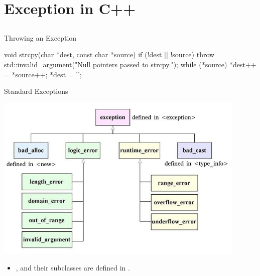 \documentclass{beamer}
\begin{document}
\section{Exception in C++}

\subsection{}

\begin{frame}[fragile]{Throwing an Exception}
    \begin{cpp}
void strcpy(char *dest, const char *source) {
  if (!dest || !source)
    throw std::invalid_argument("Null pointers passed to strcpy.");
  while (*source)
    *dest++ = *source++;
  *dest = '\0';
}
    \end{cpp}
\end{frame}

\begin{frame}{Standard Exceptions}
    \begin{center}
        \includegraphics[width=0.9\textwidth]{img/ExceptionClasses.jpg}
    \end{center}
    \begin{itemize}
        \item {},  and their subclasses are defined in .
    \end{itemize}
\end{frame}
\end{document}
